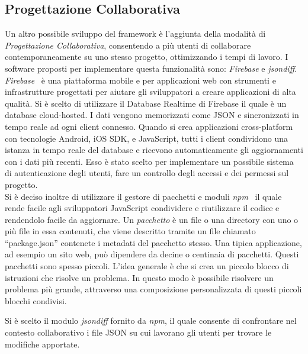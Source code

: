 \subsection{Progettazione Collaborativa}
\label{sec:conclusions_section_2_sub_2}
Un altro possibile sviluppo del framework è l'aggiunta della modalità di \emph{Progettazione Collaborativa}, consentendo a più utenti
di collaborare contemporaneamente su uno stesso progetto, ottimizzando i tempi di lavoro.
I software proposti per implementare questa funzionalità sono:
\emph{Firebase} e \emph{jsondiff}.\\
\emph{Firebase}~\cite{firebase} è una piattaforma mobile e per applicazioni web con strumenti e infrastrutture progettati
per aiutare gli sviluppatori a creare applicazioni di alta qualità. Si è scelto di utilizzare
il Database Realtime di Firebase  il quale è un database cloud-hosted. I dati vengono memorizzati come JSON e
sincronizzati in tempo reale ad ogni client connesso. Quando si crea applicazioni cross-platform con
tecnologie Android, iOS SDK, e JavaScript, tutti i client condividono una istanza in tempo reale del
database e ricevono automaticamente gli aggiornamenti con i dati più recenti.
Esso è stato scelto per implementare un possibile sistema di autenticazione degli utenti,
fare un controllo degli accessi e dei permessi sul progetto.\\
Si è deciso inoltre di utilizzare il gestore di pacchetti e moduli \emph{npm}~\cite{npm} il quale rende facile agli sviluppatori
JavaScript condividere e riutilizzare il codice e rendendolo facile da aggiornare.
Un \emph{pacchetto} è un file o una directory con uno o più file in essa contenuti, che viene descritto tramite un file chiamato ``package.json''
contenete i metadati del pacchetto stesso. Una tipica applicazione, ad esempio un sito web, può dipendere da decine o centinaia di pacchetti.
Questi pacchetti sono spesso piccoli. L'idea generale è che si crea un piccolo blocco di istruzioni che risolve un problema.
In questo modo è possibile risolvere un problema più grande, attraverso una composizione personalizzata di questi piccoli
blocchi condivisi.
\newpage

Si è scelto il modulo \emph{jsondiff} fornito da \emph{npm}, il quale consente di confrontare nel contesto collaborativo
i file JSON su cui lavorano gli utenti per trovare le modifiche apportate.\\

